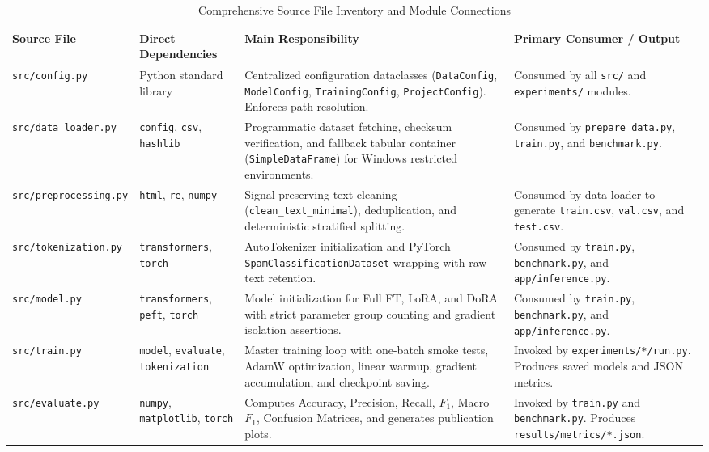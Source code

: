 \documentclass[conference]{IEEEtran}
\begin{document}
\begin{table}[htbp]
\caption{Comprehensive Source File Inventory and Module Connections}
\label{tab:file_inventory}
\centering
\scriptsize
\begin{tabularx}{\textwidth}{l p{3.2cm} p{5.5cm} p{4.0cm}}
\toprule
\textbf{Source File} & \textbf{Direct Dependencies} & \textbf{Main Responsibility} & \textbf{Primary Consumer / Output} \\
\midrule
\texttt{src/config.py} & Python standard library & Centralized configuration dataclasses (\texttt{DataConfig}, \texttt{ModelConfig}, \texttt{TrainingConfig}, \texttt{ProjectConfig}). Enforces path resolution. & Consumed by all \texttt{src/} and \texttt{experiments/} modules. \\
\addlinespace
\texttt{src/data\_loader.py} & \texttt{config}, \texttt{csv}, \texttt{hashlib} & Programmatic dataset fetching, checksum verification, and fallback tabular container (\texttt{SimpleDataFrame}) for Windows restricted environments. & Consumed by \texttt{prepare\_data.py}, \texttt{train.py}, and \texttt{benchmark.py}. \\
\addlinespace
\texttt{src/preprocessing.py} & \texttt{html}, \texttt{re}, \texttt{numpy} & Signal-preserving text cleaning (\texttt{clean\_text\_minimal}), deduplication, and deterministic stratified splitting. & Consumed by data loader to generate \texttt{train.csv}, \texttt{val.csv}, and \texttt{test.csv}. \\
\addlinespace
\texttt{src/tokenization.py} & \texttt{transformers}, \texttt{torch} & AutoTokenizer initialization and PyTorch \texttt{SpamClassificationDataset} wrapping with raw text retention. & Consumed by \texttt{train.py}, \texttt{benchmark.py}, and \texttt{app/inference.py}. \\
\addlinespace
\texttt{src/model.py} & \texttt{transformers}, \texttt{peft}, \texttt{torch} & Model initialization for Full FT, LoRA, and DoRA with strict parameter group counting and gradient isolation assertions. & Consumed by \texttt{train.py}, \texttt{benchmark.py}, and \texttt{app/inference.py}. \\
\addlinespace
\texttt{src/train.py} & \texttt{model}, \texttt{evaluate}, \texttt{tokenization} & Master training loop with one-batch smoke tests, AdamW optimization, linear warmup, gradient accumulation, and checkpoint saving. & Invoked by \texttt{experiments/*/run.py}. Produces saved models and JSON metrics. \\
\addlinespace
\texttt{src/evaluate.py} & \texttt{numpy}, \texttt{matplotlib}, \texttt{torch} & Computes Accuracy, Precision, Recall, $F_1$, Macro $F_1$, Confusion Matrices, and generates publication plots. & Invoked by \texttt{train.py} and \texttt{benchmark.py}. Produces \texttt{results/metrics/*.json}. \\

\end{tabularx}
\end{table}
\end{document}
